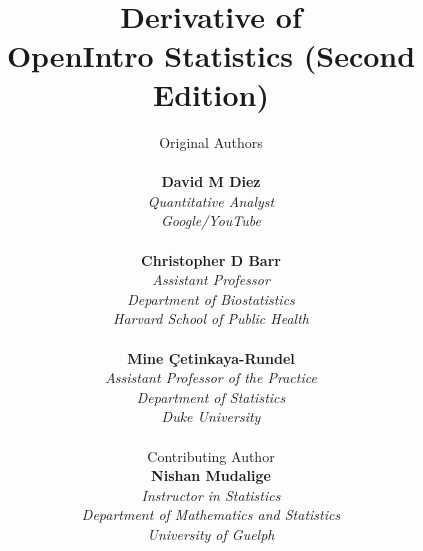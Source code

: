 



\title{\Huge{\textbf{  \color{oiB}{Introduction to Probability and Statistics} }}\\
\hfill\\
\Large{\textbf{ \color{oiB}{Customized Course Text for\\ STAT*2060: Statistics for Business Decisions} } }\\[6mm]
\large Derivative of \\
OpenIntro Statistics (Second Edition)
 }
\author{\Large Original Authors	\normalsize \\
\hfill\\
\normalsize \textbf{David M Diez} \\
\small \emph{Quantitative Analyst} \\
\small \emph{Google/YouTube} \\
\hfill\\
\normalsize \textbf{Christopher D Barr} \\
\small \emph{Assistant Professor} \\
\small \emph{Department of Biostatistics} \\
\small \emph{Harvard School of Public Health} \\
\hfill\\
\normalsize \textbf{Mine \c{C}etinkaya-Rundel} \\
\small \emph{Assistant Professor of the Practice} \\
\small \emph{Department of Statistics} \\
\small \emph{Duke University} \\
\hfill\\
\Large Contributing Author \\[2.5mm]
\normalsize \textbf{Nishan Mudalige} \\
\small \emph{Instructor in Statistics} \\
\small \emph{Department of Mathematics and Statistics} \\
\small \emph{University of Guelph} \\
}

